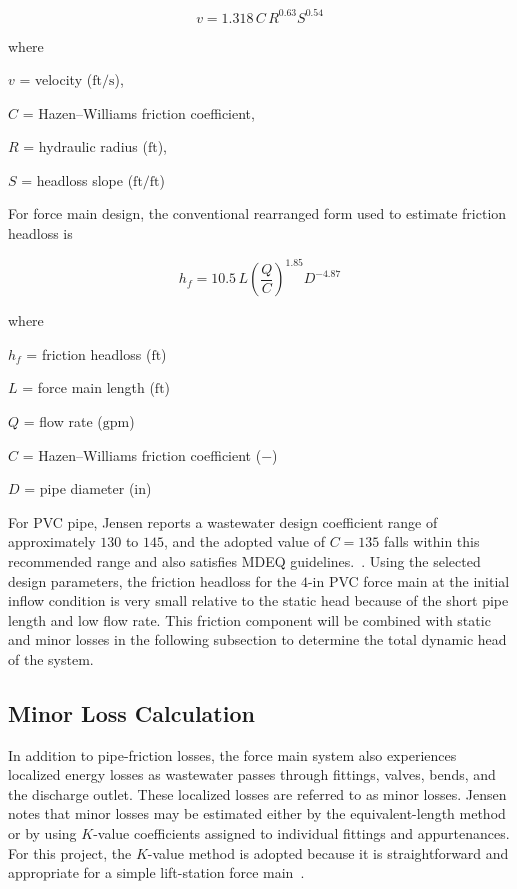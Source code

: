 \begin{equation}
v = 1.318\, C\, R^{0.63} S^{0.54}
\end{equation}


where

$v$ = velocity ($\text{ft/s}$), 

$C$ = Hazen--Williams friction coefficient, 

$R$ = hydraulic radius ($\text{ft}$), 

$S$ = headloss slope ($\text{ft/ft}$)

For force main design, the conventional rearranged form used to estimate friction headloss is

\begin{equation}
h_f = 10.5\, L \left(\frac{Q}{C}\right)^{1.85} D^{-4.87}
\end{equation}

where

$h_f$ = friction headloss ($\text{ft}$)

$L$ = force main length ($\text{ft}$)

$Q$ = flow rate ($\text{gpm}$)

$C$ = Hazen--Williams friction coefficient ($-$)

$D$ = pipe diameter ($\text{in}$)

For PVC pipe, Jensen reports a wastewater design coefficient range of approximately $130$ to $145$, and the adopted value of $C = 135$ falls within this recommended range and also satisfies MDEQ guidelines.~\cite{Jensen_PumpStationDesignGuidelines_2012, MDEQ_DesignGuidance_2025}. Using the selected design parameters, the friction headloss for the $4$-in PVC force main at the initial inflow condition is very small relative to the static head because of the short pipe length and low flow rate. This friction component will be combined with static and minor losses in the following subsection to determine the total dynamic head of the system.


\subsection{Minor Loss Calculation}

In addition to pipe-friction losses, the force main system also experiences localized energy losses as wastewater passes through fittings, valves, bends, and the discharge outlet. These localized losses are referred to as minor losses. Jensen notes that minor losses may be estimated either by the equivalent-length method or by using $K$-value coefficients assigned to individual fittings and appurtenances. For this project, the $K$-value method is adopted because it is straightforward and appropriate for a simple lift-station force main~\cite{Jensen_PumpStationDesignGuidelines_2012}.

